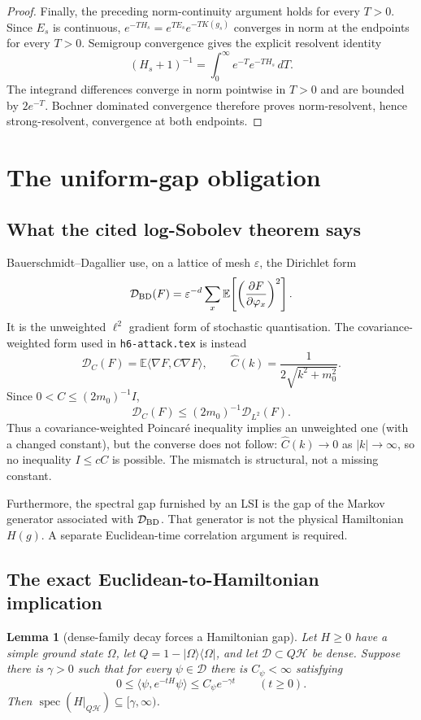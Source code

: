 \documentclass[11pt,a4paper]{article}
\newtheorem{lemma}[theorem]{Lemma}
\theoremstyle{remark}
\newcommand{\Om}{\Omega}
\newcommand{\E}{\mathbb E}
\DeclareMathOperator{\spec}{spec}
\begin{document}
\begin{proof}
Finally, the preceding norm-continuity argument holds for every $T>0$.  Since $E_s$ is continuous,
$e^{-TH_s}=e^{TE_s}e^{-TK(g_s)}$ converges in norm at the endpoints for every $T>0$.  Semigroup
convergence gives the explicit resolvent identity
\[
 (H_s+1)^{-1}=\int_0^\infty e^{-T}e^{-TH_s}\,dT.
\]
The integrand differences converge in norm pointwise in $T>0$ and are bounded by $2e^{-T}$.
Bochner dominated convergence therefore proves norm-resolvent, hence strong-resolvent,
convergence at both endpoints.
\end{proof}

\section{The uniform-gap obligation}\label{sec:gap}

\subsection{What the cited log-Sobolev theorem says}

Bauerschmidt--Dagallier \cite[Eq.~(1.6), Thm.~1.1]{BD} use, on a lattice of mesh $\varepsilon$,
the Dirichlet form
\[
 \mathcal D_{\rm BD}(F)
 =\varepsilon^{-d}\sum_x
   \E\!\left[\left(\frac{\partial F}{\partial\varphi_x}\right)^2\right].
\]
It is the unweighted $\ell^2$ gradient form of stochastic quantisation.  The covariance-weighted
form used in \texttt{h6-attack.tex} is instead
\[
 \mathcal D_C(F)=\E\langle\nabla F,C\nabla F\rangle,
 \qquad \widehat C(k)=\frac{1}{2\sqrt{k^2+m_0^2}}.
\]
Since $0<C\le(2m_0)^{-1}I$,
\[
 \mathcal D_C(F)\le(2m_0)^{-1}\mathcal D_{L^2}(F).
\]
Thus a covariance-weighted Poincar\'e inequality implies an unweighted one (with a changed
constant), but the converse does not follow: $\widehat C(k)\to0$ as $|k|\to\infty$, so no
inequality $I\le cC$ is possible.  The mismatch is structural, not a missing constant.

Furthermore, the spectral gap furnished by an LSI is the gap of the Markov generator associated
with $\mathcal D_{\rm BD}$.  That generator is not the physical Hamiltonian $H(g)$.  A separate
Euclidean-time correlation argument is required.

\subsection{The exact Euclidean-to-Hamiltonian implication}

\begin{lemma}[dense-family decay forces a Hamiltonian gap]\label{lem:decaygap}
Let $H\ge0$ have a simple ground state $\Om$, let $Q=1-|\Om\rangle\langle\Om|$, and let
$\mathscr D\subset Q\mathcal H$ be dense.  Suppose there is $\gamma>0$ such that for every
$\psi\in\mathscr D$ there is $C_\psi<\infty$ satisfying
\[
 0\le\langle\psi,e^{-tH}\psi\rangle\le C_\psi e^{-\gamma t}
 \qquad(t\ge0).
\]
Then $\spec(H|_{Q\mathcal H})\subseteq[\gamma,\infty)$.
\end{lemma}
\end{document}
